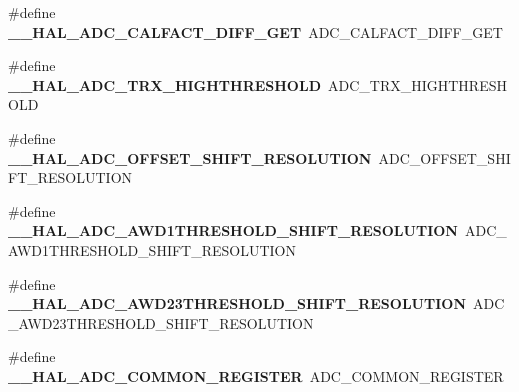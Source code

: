 \begin{DoxyCompactItemize}
\item 
\mbox{\label{group___h_a_l___a_d_c___aliased___macros_ga04d8142122bd9275a1219043edc63d98}} 
\#define {\bfseries \+\_\+\+\_\+\+H\+A\+L\+\_\+\+A\+D\+C\+\_\+\+C\+A\+L\+F\+A\+C\+T\+\_\+\+D\+I\+F\+F\+\_\+\+G\+ET}~A\+D\+C\+\_\+\+C\+A\+L\+F\+A\+C\+T\+\_\+\+D\+I\+F\+F\+\_\+\+G\+ET
\item 
\mbox{\label{group___h_a_l___a_d_c___aliased___macros_ga33afa59f288d4671512aed3dfb8f70b7}} 
\#define {\bfseries \+\_\+\+\_\+\+H\+A\+L\+\_\+\+A\+D\+C\+\_\+\+T\+R\+X\+\_\+\+H\+I\+G\+H\+T\+H\+R\+E\+S\+H\+O\+LD}~A\+D\+C\+\_\+\+T\+R\+X\+\_\+\+H\+I\+G\+H\+T\+H\+R\+E\+S\+H\+O\+LD
\item 
\mbox{\label{group___h_a_l___a_d_c___aliased___macros_ga0f83fc077ad488745139c8e24641d437}} 
\#define {\bfseries \+\_\+\+\_\+\+H\+A\+L\+\_\+\+A\+D\+C\+\_\+\+O\+F\+F\+S\+E\+T\+\_\+\+S\+H\+I\+F\+T\+\_\+\+R\+E\+S\+O\+L\+U\+T\+I\+ON}~A\+D\+C\+\_\+\+O\+F\+F\+S\+E\+T\+\_\+\+S\+H\+I\+F\+T\+\_\+\+R\+E\+S\+O\+L\+U\+T\+I\+ON
\item 
\mbox{\label{group___h_a_l___a_d_c___aliased___macros_ga616002cefa3a1ba7af4fa612afd02561}} 
\#define {\bfseries \+\_\+\+\_\+\+H\+A\+L\+\_\+\+A\+D\+C\+\_\+\+A\+W\+D1\+T\+H\+R\+E\+S\+H\+O\+L\+D\+\_\+\+S\+H\+I\+F\+T\+\_\+\+R\+E\+S\+O\+L\+U\+T\+I\+ON}~A\+D\+C\+\_\+\+A\+W\+D1\+T\+H\+R\+E\+S\+H\+O\+L\+D\+\_\+\+S\+H\+I\+F\+T\+\_\+\+R\+E\+S\+O\+L\+U\+T\+I\+ON
\item 
\mbox{\label{group___h_a_l___a_d_c___aliased___macros_ga4038d6abc1b95e035a2a0b51fb999db2}} 
\#define {\bfseries \+\_\+\+\_\+\+H\+A\+L\+\_\+\+A\+D\+C\+\_\+\+A\+W\+D23\+T\+H\+R\+E\+S\+H\+O\+L\+D\+\_\+\+S\+H\+I\+F\+T\+\_\+\+R\+E\+S\+O\+L\+U\+T\+I\+ON}~A\+D\+C\+\_\+\+A\+W\+D23\+T\+H\+R\+E\+S\+H\+O\+L\+D\+\_\+\+S\+H\+I\+F\+T\+\_\+\+R\+E\+S\+O\+L\+U\+T\+I\+ON
\item 
\mbox{\label{group___h_a_l___a_d_c___aliased___macros_ga00ebbedf4015e4538720e7a6dbacce59}} 
\#define {\bfseries \+\_\+\+\_\+\+H\+A\+L\+\_\+\+A\+D\+C\+\_\+\+C\+O\+M\+M\+O\+N\+\_\+\+R\+E\+G\+I\+S\+T\+ER}~A\+D\+C\+\_\+\+C\+O\+M\+M\+O\+N\+\_\+\+R\+E\+G\+I\+S\+T\+ER

\end{DoxyCompactItemize}
